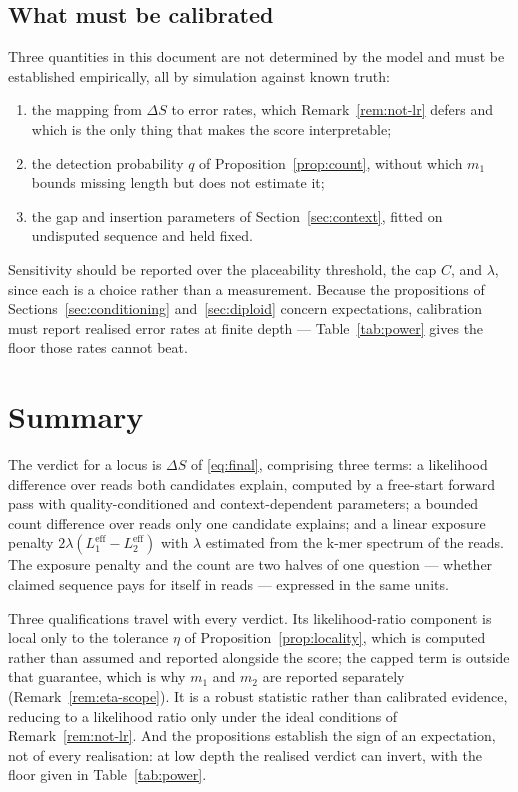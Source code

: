 \documentclass[11pt]{article}
\begin{document}
\subsection{What must be calibrated}

Three quantities in this document are not determined by the model and must be
established empirically, all by simulation against known truth:

\begin{enumerate}
    \item the mapping from $\Delta S$ to error rates, which
          Remark~\ref{rem:not-lr} defers and which is the only thing that makes
          the score interpretable;
    \item the detection probability $q$ of Proposition~\ref{prop:count},
          without which $m_1$ bounds missing length but does not estimate it;
    \item the gap and insertion parameters of Section~\ref{sec:context}, fitted
          on undisputed sequence and held fixed.
\end{enumerate}

Sensitivity should be reported over the placeability threshold, the cap $C$,
and $\lambda$, since each is a choice rather than a measurement.  Because the
propositions of Sections~\ref{sec:conditioning} and~\ref{sec:diploid} concern
expectations, calibration must report realised error rates at finite depth ---
Table~\ref{tab:power} gives the floor those rates cannot beat.

\section{Summary}

The verdict for a locus is $\Delta S$ of \eqref{eq:final}, comprising three
terms: a
likelihood difference over reads both candidates explain, computed by a
free-start forward pass with quality-conditioned and context-dependent
parameters; a
bounded count difference over reads only one candidate explains; and a linear
exposure penalty $2\lambda(L_1^{\mathrm{eff}}-L_2^{\mathrm{eff}})$ with
$\lambda$ estimated from the k-mer spectrum of the reads.  The exposure penalty
and the count are two halves of one question --- whether claimed sequence pays
for itself in reads --- expressed in the same units.

Three qualifications travel with every verdict.  Its likelihood-ratio component
is local only to the tolerance $\eta$ of Proposition~\ref{prop:locality}, which
is computed rather than assumed and reported alongside the score; the capped
term is outside that guarantee, which is why $m_1$ and $m_2$ are reported
separately (Remark~\ref{rem:eta-scope}).  It is a robust statistic rather
than calibrated evidence, reducing to a likelihood ratio only under the ideal
conditions of Remark~\ref{rem:not-lr}.  And the propositions establish the sign
of an expectation, not of every realisation: at low depth the realised verdict
can invert, with the floor given in Table~\ref{tab:power}.
\end{document}
